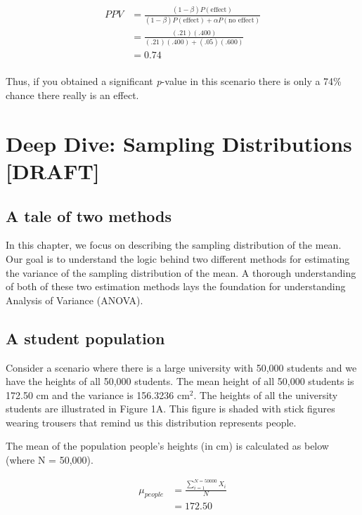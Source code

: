 \documentclass[
]{krantz}
\begin{document}
\[
\begin{aligned}
PPV &= \frac{(1 - \beta)P(\text{effect})}{(1 - \beta)P(\text{effect}) + \alpha P(\text{no effect})}\\
&= \frac{(.21)(.400)}{(.21)(.400) + (.05)(.600)}\\
&= 0.74\\
\end{aligned}
\]

Thus, if you obtained a significant \emph{p}-value in this scenario there is only a 74\% chance there really is an effect.

\hypertarget{deep-dive-sampling-distributions-draft}{%
\chapter{Deep Dive: Sampling Distributions {[}DRAFT{]}}\label{deep-dive-sampling-distributions-draft}}

\hypertarget{a-tale-of-two-methods}{%
\section{A tale of two methods}\label{a-tale-of-two-methods}}

In this chapter, we focus on describing the sampling distribution of the mean. Our goal is to understand the logic behind two different methods for estimating the variance of the sampling distribution of the mean. A thorough understanding of both of these two estimation methods lays the foundation for understanding Analysis of Variance (ANOVA).

\hypertarget{a-student-population}{%
\section{A student population}\label{a-student-population}}

Consider a scenario where there is a large university with 50,000 students and we have the heights of all 50,000 students. The mean height of all 50,000 students is 172.50 cm and the variance is 156.3236 cm\(^2\). The heights of all the university students are illustrated in Figure 1A. This figure is shaded with stick figures wearing trousers that remind us this distribution represents people.

The mean of the population people's heights (in cm) is calculated as below (where N = 50,000).

\[
\begin{aligned} 
\mu_{people} &= \frac{\sum_{i=1}^{N=50000}{X_i}}{N}\\
&= 172.50\\
\end{aligned} 
\]
\end{document}
